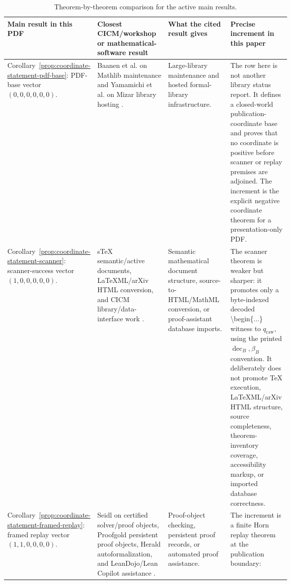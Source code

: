\documentclass[runningheads]{llncs}
\DeclareRobustCommand{\auditbegintoken}{\mbox{\normalfont\ttfamily\textbackslash{}begin\{...\}}}
\newcommand{\rawBeginTokenCoord}{q_{\mathrm{raw}}}
\newcommand{\qlex}{\rawBeginTokenCoord}
\begin{document}
\begin{table}
\caption{Theorem-by-theorem comparison for the active main results.}
\label{tab:active-theorem-by-theorem-comparison}
\scriptsize
\setlength{\tabcolsep}{1.2pt}
\renewcommand{\arraystretch}{0.90}
\begin{tabularx}{\linewidth}{@{}L{0.20\linewidth}L{0.25\linewidth}L{0.22\linewidth}Y@{}}
\toprule
Main result in this PDF & Closest CICM/workshop or mathematical-software result & What the cited result gives & Precise increment in this paper \\
\midrule
Corollary~\ref{prop:coordinate-statement-pdf-base}: PDF-base vector
\((0,0,0,0,0,0)\). &
Baanen et al. on Mathlib maintenance and Yamamichi et al. on Mizar library
hosting
\cite{BaanenEtAl2026GrowingMathlib,YamamichiEtAl2021MizarPlatform}. &
Large-library maintenance and hosted formal-library infrastructure. &
The row here is not another library status report.  It defines a closed-world
publication-coordinate base and proves that no coordinate is positive before
scanner or replay premises are adjoined.  The increment is the explicit negative
coordinate theorem for a presentation-only PDF. \\
\addlinespace
Corollary~\ref{prop:coordinate-statement-scanner}: scanner-success vector
\((1,0,0,0,0,0)\). &
sTeX semantic/active documents, LaTeXML/arXiv HTML conversion, and CICM
library/data-interface work
\cite{KohlhaseMuellerSchaefer2021STeX,FrankstonEtAl2024HTMLPapers,GinevEtAl2026ArXivHTML,BauerEtAl2024LeanHoG}. &
Semantic mathematical document structure, source-to-HTML/MathML conversion, or
proof-assistant database imports. &
The scanner theorem is weaker but sharper: it promotes only a byte-indexed
decoded \auditbegintoken{} witness to \(\qlex\), using the printed
\(\operatorname{dec}_B,\beta_B\) convention.  It deliberately does not promote
\TeX{} execution, LaTeXML/arXiv HTML structure, source completeness,
theorem-inventory coverage, accessibility markup, or imported database
correctness. \\
\addlinespace
Corollary~\ref{prop:coordinate-statement-framed-replay}: framed replay vector
\((1,1,0,0,0,0)\). &
Seidl on certified solver/proof objects, Proofgold persistent proof objects,
Herald autoformalization, and LeanDojo/Lean Copilot assistance
\cite{Seidl2023NeverTrustSolver,BrownKaliszykUrban2026Proofgold,HorowitzEtAl2026Herald,YangEtAl2023LeanDojo,SongYangAnandkumar2024LeanCopilot}. &
Proof-object checking, persistent proof records, or automated proof assistance. &
The increment is a finite Horn replay theorem at the publication boundary:

\end{tabularx}
\end{table}
\end{document}
